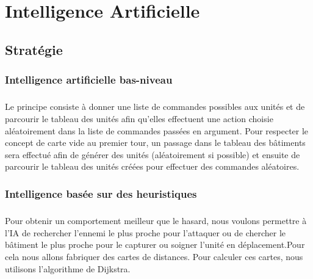 \documentclass[12pt]{report}
\begin{document}
\chapter{Intelligence Artificielle}
\section{Stratégie}
\subsection{Intelligence artificielle bas-niveau}
\paragraph{}Le principe consiste à donner une liste de commandes possibles aux unités et de parcourir le tableau des unités afin qu'elles effectuent une action choisie aléatoirement dans la liste de commandes passées en argument. Pour respecter le concept de carte vide au premier tour, un passage dans le tableau des bâtiments sera effectué afin de générer des unités (aléatoirement si possible) et ensuite de parcourir le tableau des unités créées pour effectuer des commandes aléatoires.
\subsection{Intelligence basée sur des heuristiques}
\paragraph{}Pour obtenir un comportement meilleur que le hasard, nous voulons permettre à l'IA de rechercher l'ennemi le plus proche pour l'attaquer ou de chercher le bâtiment le plus proche pour le capturer ou soigner l'unité en déplacement.Pour cela nous allons fabriquer des cartes de distances.
Pour calculer ces cartes, nous utilisons l’algorithme de Dijkstra.
    \newpage
\end{document}
